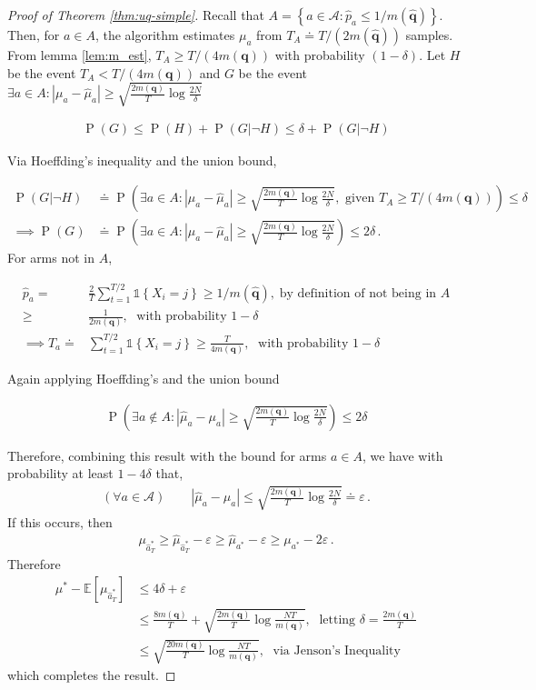 \documentclass[11pt,a4paper,oneside]{book}
\newcommand{\EE}{\mathbb E}
\newcommand{\actions}{\mathcal{A}}
\newcommand{\set}[1]{\left\{#1\right\}}
\newcommand{\ind}[1]{\mathds{1}\!\!\set{#1}}
\newcommand{\eq}[1]{\begin{align*}#1\end{align*}}
\renewcommand{\P}[1]{\operatorname{P}\left(#1\right)}
\renewcommand{\vec}[1]{\boldsymbol{#1}}
\theoremstyle{plain}
\theoremstyle{definition}
\let\epsilon\varepsilon
\begin{document}
\begin{proof}[Proof of Theorem \ref{thm:uq-simple}]
Recall that $A = \set{a \in \actions : \hat p_a \leq 1/m(\vec{\hat q})}$. Then,
for $a \in A$, the algorithm estimates $\mu_a$ from $T_A \doteq T/(2m(\vec{\hat q}))$ samples. From lemma \ref{lem:m_est}, $T_A  \geq T/(4m(\vec{q}))$ with probability $(1-\delta)$. Let $H$ be the event $T_A < T/(4m(\vec{q}))$ and $G$ be the event $\exists a \in A : |\mu_a - \hat \mu_a| \geq \sqrt{\frac{2m(\vec{q})}{T} \log\frac{2N}{\delta}}$

\eq{
\P{G} \leq \P{H} + \P{G|\neg H} \leq \delta + \P{G|\neg H}
}

Via Hoeffding's inequality and the union bound, 

\eq{
\P{G|\neg H}&\doteq \P{\exists a \in A : |\mu_a - \hat \mu_a| \geq \sqrt{\frac{2m(\vec{q})}{T} \log\frac{2N}{\delta}},\text{ given }T_A \geq T/(4m(\vec{q}))} \leq \delta\\
 \implies  \P{G} & \doteq \P{\exists a \in A : |\mu_a - \hat \mu_a| \geq \sqrt{\frac{2m(\vec{q})}{T} \log\frac{2N}{\delta}}} \leq 2\delta\,.
}
For arms not in $A$,

\eq{
\hat p_a = & \frac{2}{T} \sum_{t=1}^{T/2} \ind{X_i = j} \geq 1/m(\vec{\hat q}), \; \text {by definition of not being in $A$}\\
 \geq & \frac{1}{2m(\vec{q})},\; \text{ with probability } 1-\delta \\
\implies  T_a \doteq & \sum_{t=1}^{T/2} \ind{X_i = j} \geq  \frac{T}{4m(\vec{q})},\; \text{ with probability } 1-\delta
}

Again applying Hoeffding's and the union bound

\eq{
\P{\exists a \notin A:  \left|\hat \mu_a - \mu_a\right| \geq \sqrt{\frac{2m(\vec{q})}{T} \log \frac{2N}{\delta}}} \leq 2\delta
}


Therefore, combining this result with the bound for arms $a \in A$, we have with probability at least $1 - 4\delta$ that,
\eq{
(\forall a \in \actions) \qquad |\hat \mu_a - \mu_a| \leq \sqrt{\frac{2m(\vec{q})}{T} \log \frac{2N}{\delta}} \doteq \epsilon\,.
}
If this occurs, then 
\eq{
\mu_{\hat a^*_T} \geq \hat \mu_{\hat a^*_T} - \epsilon \geq \hat \mu_{a^*} - \epsilon \geq \mu_{a^*} - 2\epsilon\,.
}
Therefore
\eq{
\mu^* - \EE[\mu_{\hat a^*_T}] 
& \leq 4\delta + \epsilon\\
& \leq \frac{8m(\vec{q})}{T} + \sqrt{\frac{2m(\vec{q})}{T} \log \frac{NT}{m(\vec{q})}},\; \text{ letting } \delta = \frac{2m(\vec{q})}{T}\\
& \leq \sqrt{\frac{20m(\vec{q})}{T} \log \frac{NT}{m(\vec{q})}},\; \text{ via Jenson's Inequality}
}
which completes the result.
\end{proof}
\end{document}
